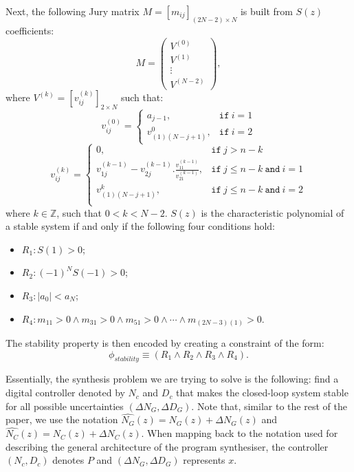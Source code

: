 \documentclass{sig-alternate-05-2015}
\newcommand{\red}[1]{{\color{red}#1}}
\begin{document}
Next, the following Jury matrix
$M = [m_{ij}]_{(2N−2)\times N}$ is built from $S(z)$ coefficients:
%
$$
M=\left( 
\begin{array}{c}
V^{(0)}\\
V^{(1)}\\
\vdots\\
V^{(N-2)}
\end{array}
\right), 
$$
%
where $V^{(k)} = [v^{(k)}_{ij} ]_{2\times N}$ such that:
%
$$
v_{ij}^{(0)}=\left\{
\begin{array}{ll}
a_{j-1}, & \texttt{if}~i=1\\
v_{(1)(N-j+1)}^{0},&\texttt{if}~i=2
\end{array}
\right.
$$
%
$$
v_{ij}^{(k)}=\left\{
\begin{array}{ll}
0,&\texttt{if}~j>n-k\\
v_{1j}^{(k-1)}-v_{2j}^{(k-1)} . \frac{v_{11}^{(k-1)}}{v_{21}^{(k-1)}}, & \texttt{if}~j\leq n-k ~\texttt{and}~i=1\\
v_{(1)(N-j+1)}^{k},& \texttt{if}~j\leq n-k ~\texttt{and}~i=2\\
\end{array}
\right.
$$
%
where $k \in \mathbb{Z}$, such that $0 < k < N - 2$. 
$S(z)$ is the
characteristic polynomial of a stable system if and only if the following four conditions hold:
\begin{itemize}
\item $R_1: S(1) > 0$;
\item $R_2: (−1)^N S(−1) > 0$;
\item $R_3: |a_0| < a_N$;
\item $R_4: m_{11} > 0 \wedge m_{31}>0 \wedge m_{51}>0 \wedge \cdots \wedge m_{(2N{-}3)(1)}>0$.
\end{itemize}

The stability property is then encoded by creating a
constraint of the form:
$$
\phi_{stability} \equiv (R_1 \wedge R_2 \wedge R_3 \wedge R_4).
$$

Essentially, the synthesis problem we are trying to solve is the following:
find a digital controller denoted by  $N_c$ and $D_c$ that
makes the closed-loop system stable 
for all possible uncertainties $(\Delta N_G, \Delta D_G)$. 
Note that, similar to the rest of the paper, we use the notation 
$\hat{N_G}(z) = N_G(z) + \Delta N_G(z)$ and 
$\hat{N_C}(z) = N_C(z) + \Delta N_C(z)$.
When mapping back to the notation used for describing the general architecture 
of the program synthesiser, the controller $(N_c,D_c)$ denotes $P$ and 
$(\Delta N_G, \Delta D_G)$ represents $x$. 
\end{document}
